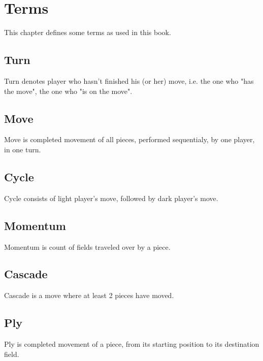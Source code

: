

\chapter*{Terms}
\label{ch:Terms}

This chapter defines some terms as used in this book.

\section*{Turn}
\label{sec:Terms/Turn}
Turn denotes player who hasn't finished his (or her) move, i.e. the one who "has the move",
the one who "is on the move".

\section*{Move}
\label{sec:Terms/Move}
Move is completed movement of all pieces, performed sequentialy, by one player, in one turn.

\section*{Cycle}
\label{sec:Terms/Cycle}
Cycle consists of light player's move, followed by dark player's move.

\section*{Momentum}
\label{sec:Terms/Momentum}
Momentum is count of fields traveled over by a piece.

\section*{Cascade}
\label{sec:Terms/Cascade}
Cascade is a move where at least 2 pieces have moved.

\section*{Ply}
\label{sec:Terms/Ply}
Ply is completed movement of a piece, from its starting position to its destination field.

